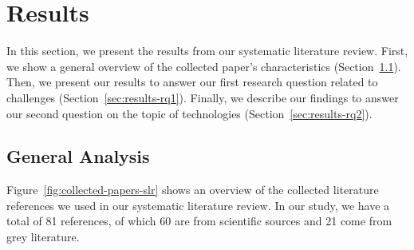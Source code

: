 
\section{Results}\label{sec:results}

In this section, we present the results from our systematic literature review. First, we show a general overview of the collected paper's characteristics (Section~\ref{sec:results-general}). Then, we present our results to answer our first research question related to challenges (Section~\ref{sec:results-rq1}). Finally, we describe our findings to answer our second question on the topic of technologies (Section~\ref{sec:results-rq2}).

\subsection{General Analysis}\label{sec:results-general}

Figure~\ref{fig:collected-papers-slr} shows an overview of the collected literature references we used in our systematic literature review. In our study, we have a total of 81 references, of which 60 are from scientific sources and 21 come from grey literature. 

